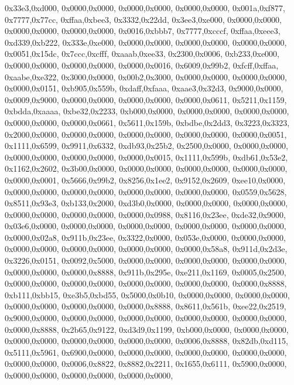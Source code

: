 {	0x33e3,0xd000,
	0x0000,0x0000,
	0x0000,0x0000,
	0x0000,0x0000,
	0x001a,0xf877,
	0x7777,0x77cc,
	0xffaa,0xbee3,
	0x3332,0x22dd,
	0x3ee3,0xe000,
	0x0000,0x0000,
	0x0000,0x0000,
	0x0000,0x0000,
	0x0016,0xbbb7,
	0x7777,0xcccf,
	0xffaa,0xeee3,
	0xd339,0xb222,
	0x333e,0xe000,
	0x0000,0x0000,
	0x0000,0x0000,
	0x0000,0x0000,
	0x0051,0x15dc,
	0x7ccc,0xcfff,
	0xaaab,0xee33,
	0x2300,0x0006,
	0xb233,0xe000,
	0x0000,0x0000,
	0x0000,0x0000,
	0x0000,0x0016,
	0x6009,0x99b2,
	0xfcff,0xffaa,
	0xaabe,0xe322,
	0x3000,0x0000,
	0x00b2,0x3000,
	0x0000,0x0000,
	0x0000,0x0000,
	0x0000,0x0151,
	0xb905,0x559b,
	0xdaff,0xfaaa,
	0xaae3,0x32d3,
	0x9000,0x0000,
	0x0009,0x9000,
	0x0000,0x0000,
	0x0000,0x0000,
	0x0000,0x0611,
	0x5211,0x1159,
	0xbdda,0xaaaa,
	0xbe32,0x2233,
	0xb000,0x0000,
	0x0000,0x0000,
	0x0000,0x0000,
	0x0000,0x0000,
	0x0000,0x0661,
	0x5611,0x159b,
	0xbdbe,0x2dd3,
	0x3223,0x3323,
	0x2000,0x0000,
	0x0000,0x0000,
	0x0000,0x0000,
	0x0000,0x0000,
	0x0000,0x0051,
	0x1111,0x6599,
	0x9911,0x6332,
	0xdb93,0x25b2,
	0x2500,0x0000,
	0x0000,0x0000,
	0x0000,0x0000,
	0x0000,0x0000,
	0x0000,0x0015,
	0x1111,0x599b,
	0xdb61,0x53e2,
	0x1162,0x2602,
	0x3b00,0x0000,
	0x0000,0x0000,
	0x0000,0x0000,
	0x0000,0x0000,
	0x0000,0x0001,
	0x5666,0x99b2,
	0x8256,0x1ee2,
	0x9152,0x2609,
	0xee10,0x0000,
	0x0000,0x0000,
	0x0000,0x0000,
	0x0000,0x0000,
	0x0000,0x0000,
	0x0559,0x5628,
	0x8511,0x93e3,
	0xb133,0x2000,
	0xd3b0,0x0000,
	0x0000,0x0000,
	0x0000,0x0000,
	0x0000,0x0000,
	0x0000,0x0000,
	0x0000,0x0988,
	0x8116,0x23ee,
	0xde32,0x9000,
	0x03e6,0x0000,
	0x0000,0x0000,
	0x0000,0x0000,
	0x0000,0x0000,
	0x0000,0x0000,
	0x0000,0x02a8,
	0x911b,0x23ee,
	0x3322,0x0000,
	0x053e,0x0000,
	0x0000,0x0000,
	0x0000,0x0000,
	0x0000,0x0000,
	0x0000,0x0000,
	0x0000,0x58a8,
	0x911d,0x2d3e,
	0x3226,0x0151,
	0x0092,0x5000,
	0x0000,0x0000,
	0x0000,0x0000,
	0x0000,0x0000,
	0x0000,0x0000,
	0x0000,0x8888,
	0x911b,0x295e,
	0xe211,0x1169,
	0x0005,0x2500,
	0x0000,0x0000,
	0x0000,0x0000,
	0x0000,0x0000,
	0x0000,0x0000,
	0x0000,0x8888,
	0xb111,0xbb15,
	0xe3b5,0xbd55,
	0x5000,0x0b10,
	0x0000,0x0000,
	0x0000,0x0000,
	0x0000,0x0000,
	0x0000,0x0000,
	0x0000,0x8888,
	0x8611,0x561b,
	0xee22,0x2519,
	0x9000,0x0000,
	0x0000,0x0000,
	0x0000,0x0000,
	0x0000,0x0000,
	0x0000,0x0000,
	0x0000,0x8888,
	0x2b65,0x9122,
	0xd3d9,0x1199,
	0xb000,0x0000,
	0x0000,0x0000,
	0x0000,0x0000,
	0x0000,0x0000,
	0x0000,0x0000,
	0x0006,0x8888,
	0x82db,0xd115,
	0x5111,0x5961,
	0x6900,0x0000,
	0x0000,0x0000,
	0x0000,0x0000,
	0x0000,0x0000,
	0x0000,0x0000,
	0x0006,0x8822,
	0x8882,0x2211,
	0x1655,0x6111,
	0x5900,0x0000,
	0x0000,0x0000,
	0x0000,0x0000,
	0x0000,0x0000,
}
